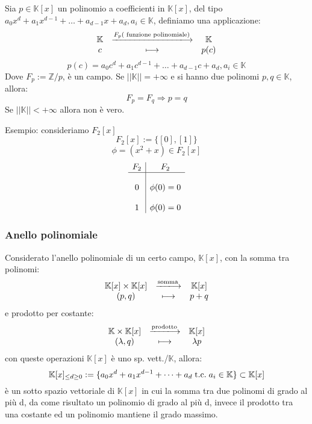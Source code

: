 \documentclass[a4paper,12pt]{article}
\begin{document}
	Sia $p \in \mathbb{K}[x]$ un polinomio a coefficienti in $\mathbb{K}[x]$, del tipo $a_0x^d + a_1 x^{d -1} + \dots + a_{d -1} x + a_d, a_i \in \mathbb{K}$, definiamo una applicazione:
	\[
	\begin{array}{c c c}
		\mathbb{K} & \xlongrightarrow{F_p (\text{ funzione polinomiale})} & \mathbb{K} \\
		c & \longmapsto & p(c) \\
	\end{array}
	\]
	\[p(c) = a_0c^d + a_1 c^{d -1} + \dots + a_{d -1} c + a_d, a_i \in \mathbb{K}\]
	Dove $F_p := \mathbb{Z}/p$, è un campo. \newline
	Se $||\mathbb{K}|| = +\infty$ e si hanno due polinomi $p, q \in \mathbb{K}$, allora:
	\[F_p = F_q \Longrightarrow p = q\]
	Se $||\mathbb{K}|| < +\infty$ allora non è vero. \newline
	
	Esempio: consideriamo $F_2[x]$
	\[F_2[x] := \{[0], [1]\}\]
	\[\phi = (x^2 + x) \in F_2[x]\]
	\[
	\begin{array}{c | c}
		F_2 & F_2 \\
		\hline
		\\
		0 & \phi(0) = 0 \\
		\\
		1 & \phi(0) = 0
	\end{array}
	\]
	
	\subsubsection{Anello polinomiale}
	Considerato l'anello polinomiale di un certo campo, $\mathbb{K}[x]$, con la somma tra polinomi:
	\[
	\begin{array}{c c c}
		\mathbb{K}[x] \times \mathbb{K}[x] & \xlongrightarrow{\text{somma}} & \mathbb{K}[x] \\
		(p, q)& \longmapsto & p + q \\
	\end{array}
	\]
	e prodotto per costante:
	\[
	\begin{array}{c c c}
		\mathbb{K} \times \mathbb{K}[x] & \xlongrightarrow{\text{prodotto}} & \mathbb{K}[x] \\
		(\lambda, q)& \longmapsto & \lambda p  \\
	\end{array}
	\]
	con queste operazioni $\mathbb{K}[x]$ è uno sp. vett./$\mathbb{K}$, allora:
	\[\mathbb{K}[x]_{ \leq d \geq 0} := \{a_0x^d + a_1x^{d - 1} + \dots + a_d \;\text{t.c.}\; a_i \in \mathbb{K}\} \subset \mathbb{K}[x]\]  
	è un sotto spazio vettoriale di $\mathbb{K}[x]$ in cui la somma tra due polinomi di grado al più d, da come risultato un polinomio di grado al più d, invece il prodotto tra una costante ed un polinomio mantiene il grado massimo.
	
\end{document}
